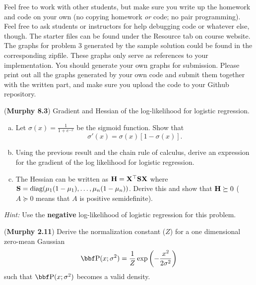 \documentclass[12pt,letterpaper]{hmcpset}
\begin{document}
Feel free to work with other students, but make sure you write up the homework
and code on your own (no copying homework \textit{or} code; no pair programming).
Feel free to ask students or instructors for help debugging code or whatever else,
though.
\newline
\newline
The starter files can be found under the Resource tab on course website. The graphs for problem 3 generated by the sample solution could be found in the corresponding zipfile. These graphs only serve as references to your implementation. You should generate your own graphs for submission. Please print out all the graphs generated by your own code and submit them together with the written part, and make sure you upload the code to your Github repository.\\

\begin{problem}[1]
	(\textbf{Murphy 8.3}) Gradient and Hessian of the log-likelihood for
	logistic regression.
	\begin{enumerate}[(a)]
		\item Let $\sigma(x) = \frac{1}{1 + e^{-x}}$ be the sigmoid function. Show that
		\[
		\sigma'(x) = \sigma(x)\left[1 - \sigma(x)\right].
		\]
		\item Using the previous result and the chain rule of calculus, derive an
		expression for the gradient of the log likelihood for logistic regression.
		\item The Hessian can be written as ${\bf H}={\bf X}^\top{\bf S}{\bf X}$ where ${\bf S} =
		{\hbox{diag}}(\mu_1(1-\mu_1), \dots, \mu_n(1-\mu_n))$. Derive this and show that
		${\bf H} \succeq 0$ ($A \succeq 0$ means that $A$ is positive semidefinite).\\
	\end{enumerate} 

\textit{Hint:} Use the \textbf{negative} log-likelihood of logistic regression for this problem.
\end{problem}
\begin{solution}
	\vfill
\end{solution}
\newpage

\begin{problem}[2]
	(\textbf{Murphy 2.11})
	Derive the normalization constant ($Z$) for a one dimensional
	zero-mean Gaussian
	\[
	\PP(x; \sigma^2) = \frac{1}{Z}\exp\left(-\frac{x^2}{2\sigma^2}\right)
	\]
	such that $\PP(x; \sigma^2)$ becomes a valid density.
\end{problem}
\begin{solution}
	\vfill
\end{solution}
\newpage
\end{document}
